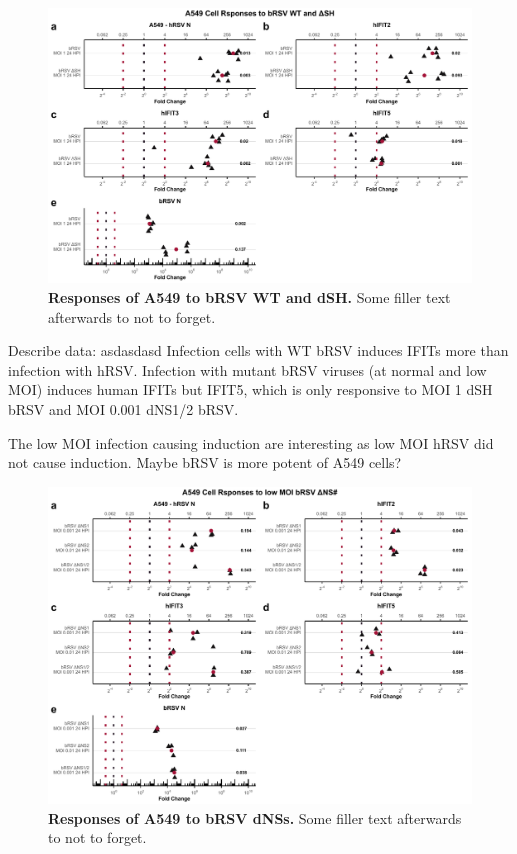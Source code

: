 \begin{figure}
    \centering
    \includegraphics[width=1\linewidth]{06. Chapter 1/Figs/01. Induction/07. a549_brsv_moi1.pdf}
    \caption[Responses of A549 to bRSV WT and dSH.]{\textbf{Responses of A549 to bRSV WT and dSH.} Some filler text afterwards to not to forget.}
    \label{Responses of A549 to bRSV WT and dSH.}
\end{figure}

Describe data: \newline
asdasdasd \newline
Infection cells with WT bRSV induces IFITs more than infection with hRSV.  Infection with mutant bRSV viruses (at normal and low MOI) induces human IFITs but IFIT5, which is only responsive to MOI 1 dSH bRSV and MOI 0.001 dNS1/2 bRSV.

The low MOI infection causing induction are interesting as low MOI hRSV did not cause induction. Maybe bRSV is more potent of A549 cells?

\begin{figure}
    \centering
    \includegraphics[width=1\linewidth]{06. Chapter 1/Figs/01. Induction/08. a549_brsv_dns.pdf}
    \caption[Responses of A549 to bRSV dNSs.]{\textbf{Responses of A549 to bRSV dNSs.} Some filler text afterwards to not to forget.}
    \label{Responses of A549 to bRSV dNSs.}
\end{figure}

